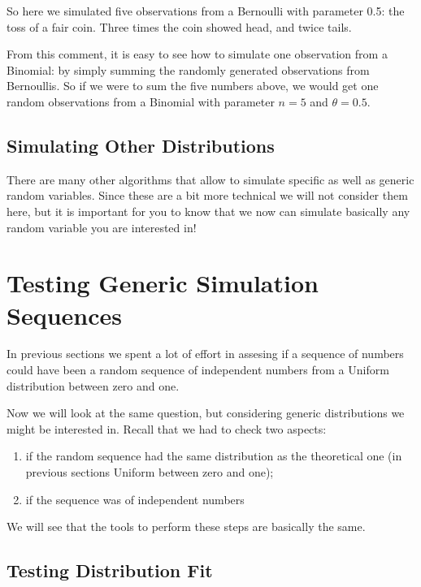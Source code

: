\documentclass[
]{book}
\begin{document}
So here we simulated five observations from a Bernoulli with parameter 0.5: the toss of a fair coin. Three times the coin showed head, and twice tails.

From this comment, it is easy to see how to simulate one observation from a Binomial: by simply summing the randomly generated observations from Bernoullis. So if we were to sum the five numbers above, we would get one random observations from a Binomial with parameter \(n=5\) and \(\theta=0.5\).

\hypertarget{simulating-other-distributions}{%
\subsection{Simulating Other Distributions}\label{simulating-other-distributions}}

There are many other algorithms that allow to simulate specific as well as generic random variables. Since these are a bit more technical we will not consider them here, but it is important for you to know that we now can simulate basically any random variable you are interested in!

\hypertarget{testing-generic-simulation-sequences}{%
\section{Testing Generic Simulation Sequences}\label{testing-generic-simulation-sequences}}

In previous sections we spent a lot of effort in assesing if a sequence of numbers could have been a random sequence of independent numbers from a Uniform distribution between zero and one.

Now we will look at the same question, but considering generic distributions we might be interested in. Recall that we had to check two aspects:

\begin{enumerate}
\def\labelenumi{\arabic{enumi}.}
\item
  if the random sequence had the same distribution as the theoretical one (in previous sections Uniform between zero and one);
\item
  if the sequence was of independent numbers
\end{enumerate}

We will see that the tools to perform these steps are basically the same.

\hypertarget{testing-distribution-fit}{%
\subsection{Testing Distribution Fit}\label{testing-distribution-fit}}
\end{document}
